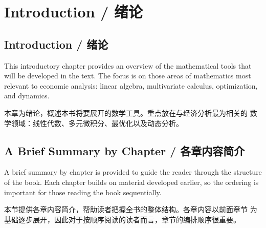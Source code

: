 
\chapter{Introduction / 绪论}

\section{Introduction / 绪论}

\begin{original}
This introductory chapter provides an overview of the mathematical
tools that will be developed in the text.  The focus is on those areas
of mathematics most relevant to economic analysis: linear algebra,
multivariate calculus, optimization, and dynamics.
\end{original}
\begin{translation}
本章为绪论，概述本书将要展开的数学工具。重点放在与经济分析最为相关的
数学领域：线性代数、多元微积分、最优化以及动态分析。
\end{translation}

\section{A Brief Summary by Chapter / 各章内容简介}

\begin{original}
A brief summary by chapter is provided to guide the reader through the
structure of the book.  Each chapter builds on material developed
earlier, so the ordering is important for those reading the book
sequentially.
\end{original}
\begin{translation}
本节提供各章内容简介，帮助读者把握全书的整体结构。各章内容以前面章节
为基础逐步展开，因此对于按顺序阅读的读者而言，章节的编排顺序很重要。
\end{translation}


